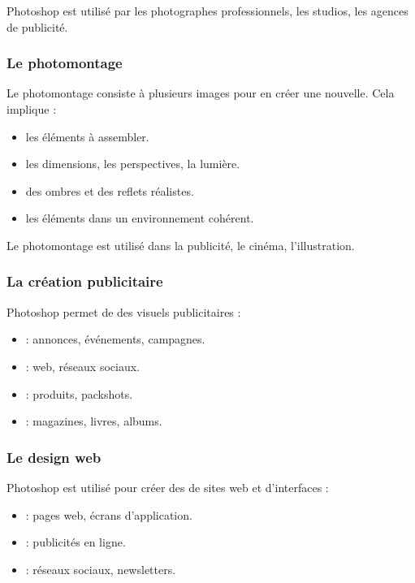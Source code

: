 Photoshop est utilisé par les photographes professionnels, les studios, les agences de publicité.

\subsubsection{Le photomontage}

Le photomontage consiste à  plusieurs images pour en créer une nouvelle. Cela implique :

\begin{itemize}
    \item {} les éléments à assembler.
    \item {} les dimensions, les perspectives, la lumière.
    \item {} des ombres et des reflets réalistes.
    \item {} les éléments dans un environnement cohérent.
\end{itemize}

Le photomontage est utilisé dans la publicité, le cinéma, l'illustration.

\subsubsection{La création publicitaire}

Photoshop permet de  des visuels publicitaires :

\begin{itemize}
    \item {} : annonces, événements, campagnes.
    \item {} : web, réseaux sociaux.
    \item {} : produits, packshots.
    \item {} : magazines, livres, albums.
\end{itemize}

\subsubsection{Le design web}

Photoshop est utilisé pour créer des  de sites web et d'interfaces :

\begin{itemize}
    \item {} : pages web, écrans d'application.
    \item {} : publicités en ligne.
    \item {} : réseaux sociaux, newsletters.
\end{itemize}

